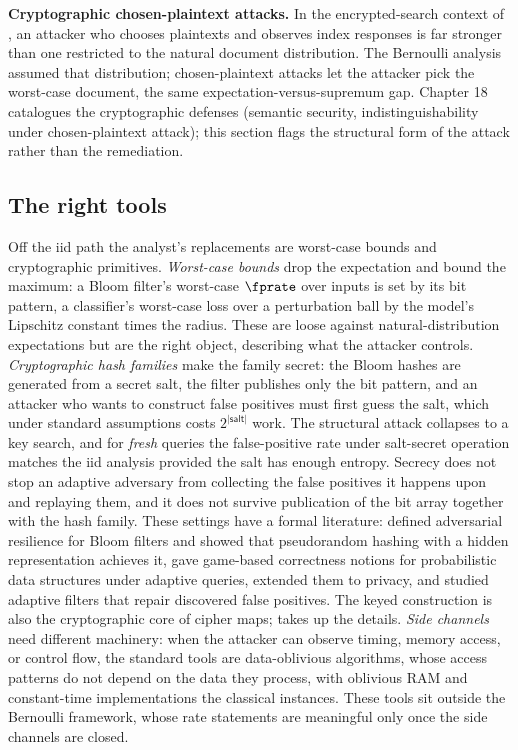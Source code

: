 \textbf{Cryptographic chosen-plaintext attacks.} In the encrypted-search
context of , an attacker who chooses plaintexts
and observes index responses is far stronger than one restricted to the
natural document distribution. The Bernoulli analysis assumed that
distribution; chosen-plaintext attacks let the attacker pick the
worst-case document, the same expectation-versus-supremum gap. Chapter 18
catalogues the cryptographic defenses (semantic security,
indistinguishability under chosen-plaintext attack); this section flags
the structural form of the attack rather than the remediation.

\subsection*{The right tools}

Off the iid path the analyst's replacements are worst-case bounds and
cryptographic primitives. \emph{Worst-case bounds} drop the expectation
and bound the maximum: a Bloom filter's worst-case $\fprate$ over inputs
is set by its bit pattern, a classifier's worst-case loss over a
perturbation ball by the model's Lipschitz constant times the radius.
These are loose against natural-distribution expectations but are the
right object, describing what the attacker controls. \emph{Cryptographic
hash families} make the family secret: the Bloom hashes are generated from
a secret salt, the filter publishes only the bit pattern, and an attacker
who wants to construct false positives must first guess the salt, which
under standard assumptions costs $2^{|\mathsf{salt}|}$ work. The structural attack collapses to a key search, and for \emph{fresh}
queries the false-positive rate under salt-secret operation matches the
iid analysis provided the salt has enough entropy. Secrecy does not stop
an adaptive adversary from collecting the false positives it happens upon
and replaying them, and it does not survive publication of the bit array
together with the hash family. These settings have a formal literature:
\textcite{naor-yogev-2015} defined adversarial resilience for Bloom
filters and showed that pseudorandom hashing with a hidden representation
achieves it, \textcite{clayton-patton-shrimpton-2019} gave game-based
correctness notions for probabilistic data structures under adaptive
queries, \textcite{filic-et-al-2022} extended them to privacy, and
\textcite{bender-et-al-2018} studied adaptive filters that repair
discovered false positives. The keyed construction is also the
cryptographic core of cipher maps;  takes up
the details. \emph{Side channels} need different machinery: when the
attacker can observe timing, memory access, or control flow, the standard
tools are data-oblivious algorithms, whose access patterns do not depend
on the data they process, with oblivious RAM and constant-time
implementations the classical instances. These tools sit outside the
Bernoulli framework, whose rate statements are meaningful only once the
side channels are closed.

